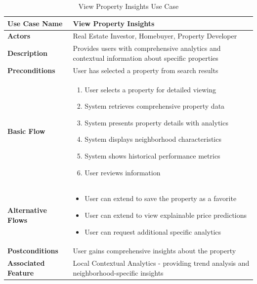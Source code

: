 \begin{table}[htbp]
	\centering
	\renewcommand{\arraystretch}{1.3}
	\begin{tabular}{|>{\columncolor[gray]{0.95}}p{}|p{}|}
		\hline
		\rowcolor[gray]{0.9} \textbf{Use Case Name} & \textbf{View Property Insights}                                                                  \\
		\hline
		\textbf{Actors}                             & Real Estate Investor, Homebuyer, Property Developer                                              \\
		\hline
		\textbf{Description}                        & Provides users with comprehensive analytics and contextual information about specific properties \\
		\hline
		\textbf{Preconditions}                      & User has selected a property from search results                                                 \\
		\hline
		\textbf{Basic Flow}                         &                                                                                                  
		\begin{enumerate}
		\item User selects a property for detailed viewing
		\item System retrieves comprehensive property data
		\item System presents property details with analytics
		\item System displays neighborhood characteristics
		\item System shows historical performance metrics
		\item User reviews information
		\end{enumerate} \\
		\hline
		\textbf{Alternative Flows}                  &                                                                                                  
		\begin{itemize}
		\item User can extend to save the property as a favorite
		\item User can extend to view explainable price predictions
		\item User can request additional specific analytics
		\end{itemize} \\
		\hline
		\textbf{Postconditions}                     & User gains comprehensive insights about the property                                             \\
		\hline
		\textbf{Associated Feature}                 & Local Contextual Analytics - providing trend analysis and neighborhood-specific insights         \\
		\hline
	\end{tabular}
	\caption{View Property Insights Use Case}
	\label{tab:insights-use-case}
\end{table}

